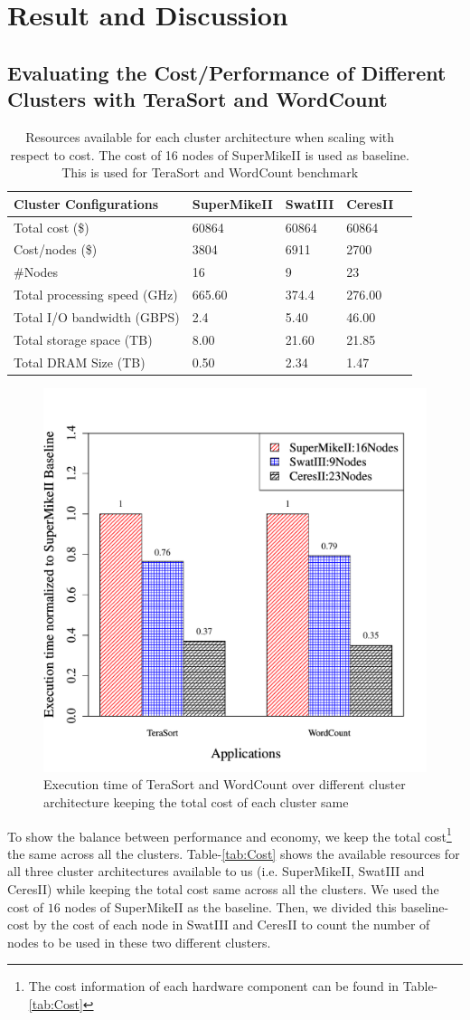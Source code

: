 \documentclass[journal]{IEEEtran}
\begin{document}
\section{Result and Discussion} \label{sec:Result}
\subsection{Evaluating the Cost/Performance of Different Clusters with TeraSort and WordCount}
\begin{table}[!t]
\caption{Resources available for each cluster architecture when scaling with respect to cost. The cost of 16 nodes of SuperMikeII is used as baseline. This is used for TeraSort and WordCount benchmark}
\label{tab:ScalingCost}
\label{fig:perf}
\centering
\begin{tabular}{|p{2.5cm}|p{1.5cm}|p{1.5cm}|p{1.5cm}|p{1.5cm}|} \hline
Cluster Configurations & SuperMikeII & SwatIII & CeresII\\ \hline
Total cost (\$) & 60864 & 60864 & 60864\\ \hline
Cost/nodes (\$) & 3804 & 6911 & 2700\\ \hline
\#Nodes & 16 & 9 & 23\\ \hline
Total processing speed (GHz) & 665.60 & 374.4 & 276.00\\ \hline
Total I/O bandwidth (GBPS) & 2.4 & 5.40 & 46.00\\ \hline
Total storage space (TB) & 8.00 & 21.60 & 21.85\\ \hline
Total DRAM Size (TB) & 0.50 & 2.34 & 1.47\\ \hline
\end{tabular}
\end{table}
\begin{figure}[!t]
\centering
\includegraphics[width=.5\textwidth]{Figures/PerformanceFigures/execTimeTnW.pdf}
\caption{Execution time of TeraSort and WordCount over different cluster architecture keeping the total cost of each cluster same}
\end{figure}
To show the balance between performance and economy, we keep the total cost\footnote{The cost information of each hardware component can be found in Table-\ref{tab:Cost}} the same across all the clusters. Table-\ref{tab:Cost} shows the available resources for all three cluster architectures available to us (i.e. SuperMikeII, SwatIII and CeresII) while keeping the total cost same across all the clusters. We used the cost of $16$ nodes of SuperMikeII as the baseline. Then, we divided this baseline-cost by the cost of each node in SwatIII and CeresII to count the number of nodes to be used in these two different clusters.
\end{document}
